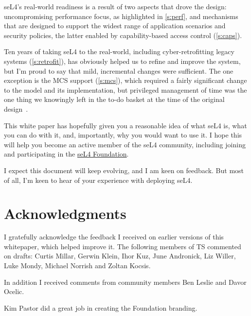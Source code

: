 \documentclass[english,a4paper,12pt\ifDraft,draft\fi]{report}
\newcommand{\Acks}{\section*{Acknowledgments}}
\newcommand{\Acks}{\chapter*{Acknowledgments}}
\providecommand{\href}[2]{\url{#2}}
\begin{document}
  seL4's real-world readiness is a result of two aspects that drove
  the design: uncompromising performance focus, as highlighted in
  \autoref{s:perf}, and mechanisms that are designed to support the
  widest range of application scenarios and security policies, the
  latter enabled by capability-based access control
  (\autoref{s:caps}).

  Ten years of taking seL4 to the real-world, including
  cyber-retrofitting legacy systems (\autoref{s:retrofit}), has obviously
  helped us to refine and improve the system, but I'm proud to say that
  mild, incremental changes were sufficient. The one exception is the
  MCS support (\autoref{s:mcs}), which required a fairly significant change
  to the model and its implementation, but privileged management of
  time was the one thing we knowingly left in the to-do basket at
  the time of the original design~\citep{Heiser_Elphinstone_16}.

  This white paper has hopefully given you a reasonable idea of what
  seL4 is, what you can do with it, and, importantly, why you would
  want to use it. I hope this will help you become an active member of
  the seL4 community, including joining and participating in the
  \href{https://sel4.systems/Foundation}{seL4 Foundation}.

  I expect this document will keep evolving, and I am keen on
  feedback. But most of all, I'm keen to hear of your experience with
  deploying seL4.


  \Acks

  I gratefully acknowledge the feedback I received on earlier versions
  of this whitepaper, which helped improve it. The following members of TS commented on drafts:
  Curtis Millar,
  Gerwin Klein,
  Ihor Kuz,
  June Andronick,
  Liz Willer,
  Luke Mondy,
  Michael Norrish and
  Zoltan Kocsis.

  In addition I received comments from community members
  Ben Leslie and
  Davor Ocelic.

  Kim Pastor did a great job in creating the Foundation branding.
  \cleardoublepage
  \sloppy
  
  
\end{document}
